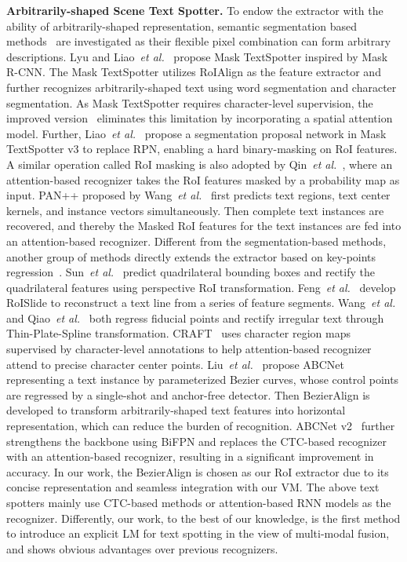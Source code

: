 \documentclass[10pt,journal,compsoc]{IEEEtran}
\def\etal{{\it et al.}\xspace}
\begin{document}
\noindent\textbf{Arbitrarily-shaped Scene Text Spotter.} To endow the extractor with the ability of arbitrarily-shaped representation, semantic segmentation based methods~\cite{lyu2018mask,qin2019towards,wang2021pan++} are investigated as their flexible pixel combination can form arbitrary descriptions. Lyu and Liao~\etal~\cite{lyu2018mask} propose Mask TextSpotter inspired by Mask R-CNN. The Mask TextSpotter utilizes RoIAlign as the feature extractor and further recognizes arbitrarily-shaped text using word segmentation and character segmentation. As Mask TextSpotter requires character-level supervision, the improved version~\cite{liao2019mask} eliminates this limitation by incorporating a spatial attention model. Further, Liao~\etal~\cite{liao2020mask} propose a segmentation proposal network in Mask TextSpotter v3 to replace RPN, enabling a hard binary-masking on RoI features. A similar operation called RoI masking is also adopted by Qin~\etal~\cite{qin2019towards}, where an attention-based recognizer takes the RoI features masked by a probability map as input. PAN++ proposed by Wang~\etal~\cite{wang2021pan++} first predicts text regions, text center kernels, and instance vectors simultaneously. Then complete text instances are recovered, and thereby the Masked RoI features for the text instances are fed into an attention-based recognizer. Different from the segmentation-based methods, another group of methods directly extends the extractor based on key-points regression~\cite{sun2018textnet,feng2019textdragon,wang2020all,qiao2020text,liu2020abcnet}. Sun~\etal~\cite{sun2018textnet} predict quadrilateral bounding boxes and rectify the quadrilateral features using perspective RoI transformation. Feng~\etal~\cite{feng2019textdragon} develop RoISlide to reconstruct a text line from a series of feature segments. Wang~\etal~\cite{wang2020all} and Qiao~\etal~\cite{qiao2020text} both regress fiducial points and rectify irregular text through Thin-Plate-Spline transformation. CRAFT~\cite{baek2020character} uses character region maps supervised by character-level annotations to help attention-based recognizer attend to precise character center points. Liu~\etal~\cite{liu2020abcnet} propose ABCNet representing a text instance by parameterized Bezier curves, whose control points are regressed by a single-shot and anchor-free detector. Then BezierAlign is developed to transform arbitrarily-shaped text features into horizontal representation, which can reduce the burden of recognition. ABCNet v2~\cite{liu2020abcnetv2} further strengthens the backbone using BiFPN and replaces the CTC-based recognizer with an attention-based recognizer, resulting in a significant improvement in accuracy. In our work, the BezierAlign is chosen as our RoI extractor due to its concise representation and seamless integration with our VM. The above text spotters mainly use CTC-based methods or attention-based RNN models as the recognizer. Differently, our work, to the best of our knowledge, is the first method to introduce an explicit LM for text spotting in the view of multi-modal fusion, and shows obvious advantages over previous recognizers.
\end{document}
